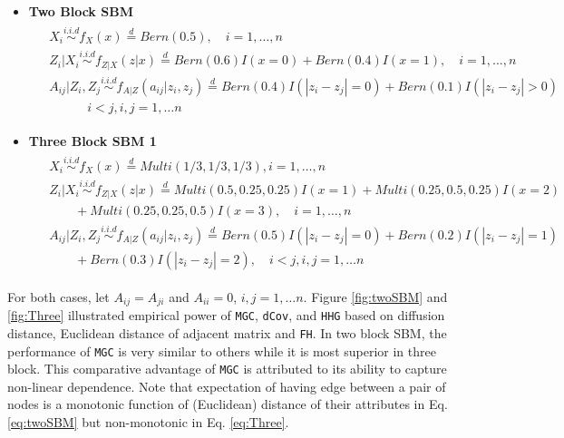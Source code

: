 \documentclass[12pt]{article}
\theoremstyle{definition}
\begin{document}
\begin{itemize}	
\item \textbf{Two Block SBM}	
\begin{equation}
\begin{gathered}
\begin{aligned}
&	X_{i}  \overset{i.i.d}{\sim} f_{X}(x)  \stackrel{d}{=}  Bern(0.5), \quad   i = 1, \ldots , n \\ 
&	Z_{i} | X_{i}   \overset{i.i.d}{\sim}    f_{Z|X}(z|x)  \stackrel{d}{=}  Bern(0.6) I( x = 0 ) +   Bern(0.4) I (x = 1), \quad  i = 1,\ldots,n  \\
&	A_{ij} | Z_{i}, Z_{j}   \overset{i.i.d}{\sim}   f_{A|Z}(a_{ij} | z_{i}, z_{j}) \stackrel{d}{=}  Bern(0.4) I ( |z_{i} - z_{j}| = 0 )  + Bern(0.1) I(|z_{i} - z_{j}| > 0) \\ & \quad \quad \quad i < j, i,j=1, \ldots n 
\end{aligned}
\end{gathered}
	\label{eq:twoSBM}
\end{equation} 
	
\item \textbf{Three Block SBM 1}
\begin{equation}
\label{eq:Three}
\begin{gathered}
\begin{aligned}
&  X_{i} \overset{i.i.d}{\sim} f_{X}(x)   \stackrel{d}{=}  Multi(1/3, 1/3, 1/3), i = 1, \ldots , n \\ 
&  Z_{i} | X_{i}  \overset{i.i.d}{\sim}    f_{Z|X}(z|x)  \stackrel{d}{=}   Multi(0.5, 0.25, 0.25) I( x = 1 ) +   Multi(0.25, 0.5, 0.25) I (x = 2)  \qquad  \\ & \quad \quad + Multi(0.25, 0.25, 0.5)I(x = 3), \quad  i = 1,\ldots,n  \\
&  A_{ij} | Z_{i}, Z_{j}   \overset{i.i.d}{\sim}   f_{A|Z}(a_{ij} | z_{i}, z_{j}) \stackrel{d}{=}  Bern(0.5) I ( |z_{i} - z_{j}| = 0 )  + Bern(0.2) I(|z_{i} - z_{j}| = 1) \\ & \quad \quad + Bern(0.3) I (|z_{i} - z_{j}| = 2),  \quad i < j, i,j=1, \ldots n 
\end{aligned}
\end{gathered}
\end{equation}
\end{itemize}
For both cases, let $A_{ij} = A_{ji}$ and $A_{ii} = 0$, $i,j=1, \ldots n$. Figure \ref{fig:twoSBM} and \ref{fig:Three} illustrated empirical power of \texttt{MGC}, \texttt{dCov}, and \texttt{HHG} based on diffusion distance, Euclidean distance of adjacent matrix and \texttt{FH}. In two block SBM, the performance of \texttt{MGC} is very similar to others while it is most superior in three block. This comparative advantage of \texttt{MGC} is attributed to its ability to capture non-linear dependence. Note that expectation of having edge between a pair of nodes is a monotonic function of (Euclidean) distance of their attributes in Eq.\ref{eq:twoSBM} but non-monotonic in Eq. \ref{eq:Three}. 
\end{document}
